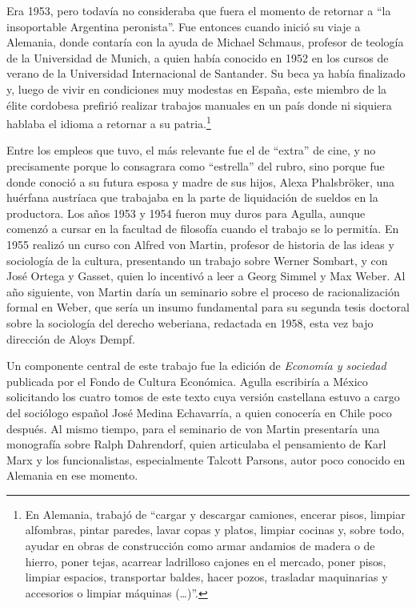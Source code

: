 Era 1953, pero todavía no consideraba que fuera el momento de retornar a \enquote{la insoportable Argentina peronista}. Fue entonces cuando inició su viaje a Alemania, donde contaría con la ayuda de Michael Schmaus, profesor de teología de la Universidad de Munich, a quien había conocido en 1952 en los cursos de verano de la Universidad Internacional de Santander. Su beca ya había finalizado y, luego de vivir en condiciones muy modestas en España, este miembro de la élite cordobesa prefirió realizar trabajos manuales en un país donde ni siquiera hablaba el idioma a retornar a su patria.\footnote{En Alemania, \textcite[31]{1634-AGULLA1997} trabajó de \enquote{cargar y descargar camiones, encerar pisos, limpiar alfombras, pintar paredes, lavar copas y platos, limpiar cocinas y, sobre todo, ayudar en obras de construcción como armar andamios de madera o de hierro, poner tejas, acarrear ladrilloso cajones en el mercado, poner pisos, limpiar espacios, transportar baldes, hacer pozos, trasladar maquinarias y accesorios o limpiar máquinas (\dots)}.}

Entre los empleos que tuvo, el más relevante fue el de \enquote{extra} de cine, y no precisamente porque lo consagrara como \enquote{estrella} del rubro, sino porque fue donde conoció a su futura esposa y madre de sus hijos, Alexa Phalsbröker, una huérfana austríaca que trabajaba en la parte de liquidación de sueldos en la productora. Los años 1953 y 1954 fueron muy duros para Agulla, aunque comenzó a cursar en la facultad de filosofía cuando el trabajo se lo permitía. En 1955 realizó un curso con Alfred von Martin, profesor de historia de las ideas y sociología de la cultura, presentando un trabajo sobre Werner Sombart, y con José Ortega y Gasset, quien lo incentivó a leer a Georg Simmel y Max Weber. Al año siguiente, von Martin daría un seminario sobre el proceso de racionalización formal en Weber, que sería un insumo fundamental para su segunda tesis doctoral sobre la sociología del derecho weberiana, redactada en 1958, esta vez bajo dirección de Aloys Dempf.

Un componente central de este trabajo fue la edición de \emph{Economía y sociedad} publicada por el Fondo de Cultura Económica. Agulla escribiría a México solicitando los cuatro tomos de este texto cuya versión castellana estuvo a cargo del sociólogo español José Medina Echavarría, a quien conocería en Chile poco después. Al mismo tiempo, para el seminario de von Martin presentaría una monografía sobre Ralph Dahrendorf, quien articulaba el pensamiento de Karl Marx y los funcionalistas, especialmente Talcott Parsons, autor poco conocido en Alemania en ese momento.

